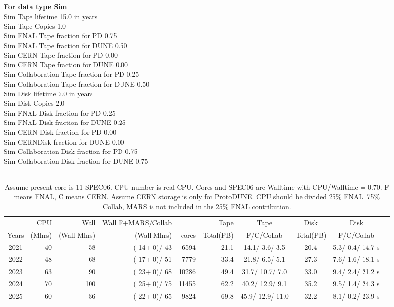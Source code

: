 \documentclass[12pt]{article}
\begin{document}
\pagebreak\\
\\
{\bf For data type Sim}\\
   Sim Tape lifetime  15.0 in years\\
   Sim Tape Copies   1.0\\
   Sim FNAL Tape fraction for PD  0.75\\
   Sim FNAL Tape fraction for DUNE  0.50\\
   Sim CERN Tape fraction for PD  0.00\\
   Sim CERN Tape fraction for DUNE  0.00\\
   Sim Collaboration Tape fraction for PD  0.25\\
   Sim Collaboration Tape fraction for DUNE  0.50\\
   Sim Disk lifetime   2.0 in years\\
   Sim Disk Copies   2.0\\
   Sim FNAL Disk fraction for PD  0.25\\
   Sim FNAL Disk fraction for DUNE  0.25\\
   Sim CERN Disk fraction for PD  0.00\\
   Sim CERNDisk fraction for DUNE  0.00\\
   Sim Collaboration Disk fraction for PD  0.75\\
   Sim Collaboration Disk fraction for DUNE  0.75\\
\pagebreak\\
\begin{table}
\footnotesize
 \centering \begin{tabular}[h]{crrrrrcccc}
 & CPU &Wall&Wall F+MARS/Collab&\qquad  & Tape\qquad& Tape\qquad  & Disk\qquad  & Disk\qquad \\
Years&(Mhrs)&(Wall-Mhrs)&(Wall-Mhrs)&cores& Total(PB)&F/C/Collab & Total(PB) &F/C/Collab\\
\hline
2021&	  40&	  58&	(  14+   0)/  43&	  6594&	     21.1&	  14.1/  3.6/  3.5&	     20.4&	   5.3/  0.4/ 14.7 s\\
2022&	  48&	  68&	(  17+   0)/  51&	  7779&	     33.4&	  21.8/  6.5/  5.1&	     27.3&	   7.6/  1.6/ 18.1 s\\
2023&	  63&	  90&	(  23+   0)/  68&	 10286&	     49.4&	  31.7/ 10.7/  7.0&	     33.0&	   9.4/  2.4/ 21.2 s\\
2024&	  70&	 100&	(  25+   0)/  75&	 11455&	     62.2&	  40.2/ 12.9/  9.1&	     35.2&	   9.5/  1.4/ 24.3 s\\
2025&	  60&	  86&	(  22+   0)/  65&	  9824&	     69.8&	  45.9/ 12.9/ 11.0&	     32.2&	   8.1/  0.2/ 23.9 s\\
\end{tabular}
\caption{Assume present core is   11 SPEC06. CPU number is real CPU. Cores and SPEC06 are Walltime with CPU/Walltime =  0.70.  F means FNAL, C means CERN. Assume CERN storage is only  for ProtoDUNE. CPU should be divided 25\% FNAL, 75\% Collab, MARS is not included in the 25\% FNAL contribution.}\normalsize
 \end{table}
\end{document}

